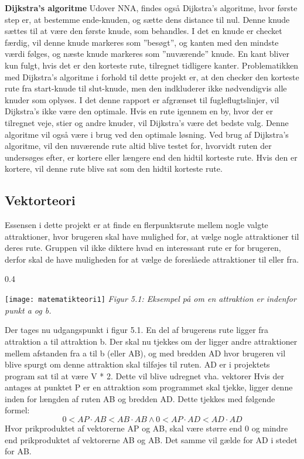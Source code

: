 \textbf{Dijkstra's algoritme}\newline
Udover NNA, findes også Dijkstra’s algoritme, hvor første step er, at bestemme ende-knuden, og sætte dens distance til nul. Denne knude sættes til at være den første knude, som behandles. I det en knude er checket færdig, vil denne knude markeres som ”besøgt”, og kanten med den mindste værdi følges, og næste knude markeres som ”nuværende” knude. En kant bliver kun fulgt, hvis det er den korteste rute, tilregnet tidligere kanter.
Problematikken med Dijkstra’s algoritme i forhold til dette projekt er, at den checker den korteste rute fra start-knude til slut-knude, men den indkluderer ikke nødvendigvis alle knuder som oplyses. I det denne rapport er afgrænset til fugleflugtslinjer, vil Dijkstra’s ikke være den optimale. Hvis en rute igennem en by, hvor der er tilregnet veje, stier og andre knuder, vil Dijkstra’s være det bedste valg. Denne algoritme vil også være i brug ved den optimale løsning. Ved brug af Dijkstra’s algoritme, vil den nuværende rute altid blive testet for, hvorvidt ruten der undersøges efter, er kortere eller længere end den hidtil korteste rute. Hvis den er kortere, vil denne rute blive sat som den hidtil korteste rute.\citep{Dijkstra}

\subsection{Vektorteori}
Essensen i dette projekt er at finde en flerpunktsrute mellem nogle valgte attraktioner, hvor brugeren skal have mulighed for, at vælge nogle attraktioner til deres rute. Gruppen vil ikke diktere hvad en interessant rute er for brugeren, derfor skal de have muligheden for at vælge de foreslåede attraktioner til eller fra.

\begin{wrapfigure}{}{0.4\textwidth}
  \vspace{-10pt}
  \begin{center}
    \texttt{[image: matematikteori1]} \newline
    \textit{Figur 5.1: Eksempel på om en attraktion er indenfor punkt a og b.}\newline
  \end{center}
  \vspace{-20pt}
\end{wrapfigure}
 
Der tages nu udgangspunkt i figur 5.1. En del af brugerens rute ligger fra attraktion a til attraktion b. Der skal nu tjekkes om der ligger andre attraktioner mellem afstanden fra a til b (eller AB), og med bredden AD hvor brugeren vil blive spurgt om denne attraktion skal tilføjes til ruten. AD er i projektets program sat til at være V * 2. Dette vil blive udregnet vha. vektorer 
Hvis der antages at punktet P er en attraktion som programmet skal tjekke, ligger denne inden for længden af ruten AB og bredden AD. Dette tjekkes med følgende formel:
\[0 < AP \cdot AB < AB \cdot AB \wedge 0 < AP \cdot AD < AD \cdot AD \]
Hvor prikproduktet af vektorerne AP og AB, skal være større end 0 og mindre end prikproduktet af vektorerne AB og AB. Det samme vil gælde for AD i stedet for AB.

